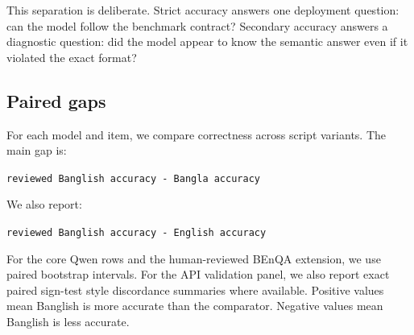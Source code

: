 This separation is deliberate. Strict accuracy answers one deployment question: can the model follow the benchmark contract? Secondary accuracy answers a diagnostic question: did the model appear to know the semantic answer even if it violated the exact format?

\subsection{Paired gaps}

For each model and item, we compare correctness across script variants. The main gap is:

\texttt{reviewed Banglish accuracy - Bangla accuracy}

We also report:

\texttt{reviewed Banglish accuracy - English accuracy}

For the core Qwen rows and the human-reviewed BEnQA extension, we use paired bootstrap intervals. For the API validation panel, we also report exact paired sign-test style discordance summaries where available. Positive values mean Banglish is more accurate than the comparator. Negative values mean Banglish is less accurate.

\endinput
